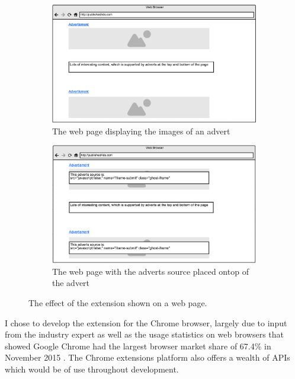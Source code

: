\documentclass[12pt]{article}
\begin{document}
\begin{figure}[H]
    \begin{subfigure}{0.3\textwidth}
        \includegraphics[scale=0.25]{siteWithAds.png}
        \caption{The web page displaying the images of an advert}
        \label{fig:siteWithAds}
    \end{subfigure} \hspace{0.2\textwidth}
    \begin{subfigure}{0.3\textwidth}
        \includegraphics[scale=0.25]{siteWithAdSource.png}
        \caption{The web page with the adverts source placed ontop of the advert}
        \label{fig:siteWithAdSource}
    \end{subfigure}
    \caption{The effect of the extension shown on a web page.}
    \label{fig:mockup}
\end{figure}

I chose to develop the extension for the Chrome browser, largely due to input from the industry expert as well as the usage statistics on web browsers that showed Google Chrome had the largest browser market share of 67.4\% in November 2015 \parencite{browserStats}. The Chrome extensions platform also offers a wealth of APIs which would be of use throughout development. \\
\end{document}
